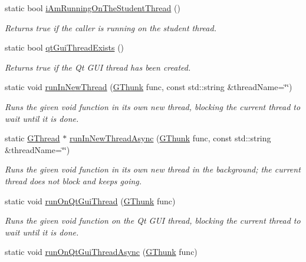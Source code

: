 \begin{DoxyCompactItemize}
static bool \mbox{\hyperlink{classsgl_1_1GThread_a3e60d512067e765b4e2d7c0c5bec39fa}{i\+Am\+Running\+On\+The\+Student\+Thread}} ()
\begin{DoxyCompactList}\small\item\em Returns true if the caller is running on the student thread. \end{DoxyCompactList}\item 
static bool \mbox{\hyperlink{classsgl_1_1GThread_afee663b5d7998135c2aab0585b2ad37f}{qt\+Gui\+Thread\+Exists}} ()
\begin{DoxyCompactList}\small\item\em Returns true if the Qt G\+UI thread has been created. \end{DoxyCompactList}\item 
static void \mbox{\hyperlink{classsgl_1_1GThread_ad70a32318f3f0a9cf25582379c6d7ffb}{run\+In\+New\+Thread}} (\mbox{\hyperlink{namespacesgl_aa508400d1219d217e0e9509ff59a58f4}{G\+Thunk}} func, const std\+::string \&thread\+Name=\char`\"{}\char`\"{})
\begin{DoxyCompactList}\small\item\em Runs the given void function in its own new thread, blocking the current thread to wait until it is done. \end{DoxyCompactList}\item 
static \mbox{\hyperlink{classsgl_1_1GThread}{G\+Thread}} $\ast$ \mbox{\hyperlink{classsgl_1_1GThread_aee1af0236d033fce36073899bb4368ed}{run\+In\+New\+Thread\+Async}} (\mbox{\hyperlink{namespacesgl_aa508400d1219d217e0e9509ff59a58f4}{G\+Thunk}} func, const std\+::string \&thread\+Name=\char`\"{}\char`\"{})
\begin{DoxyCompactList}\small\item\em Runs the given void function in its own new thread in the background; the current thread does not block and keeps going. \end{DoxyCompactList}\item 
static void \mbox{\hyperlink{classsgl_1_1GThread_a33da0c87717269710ac7a564a1ebbe64}{run\+On\+Qt\+Gui\+Thread}} (\mbox{\hyperlink{namespacesgl_aa508400d1219d217e0e9509ff59a58f4}{G\+Thunk}} func)
\begin{DoxyCompactList}\small\item\em Runs the given void function on the Qt G\+UI thread, blocking the current thread to wait until it is done. \end{DoxyCompactList}\item 
static void \mbox{\hyperlink{classsgl_1_1GThread_a4445680030c65d610b9e348d8d0cffc8}{run\+On\+Qt\+Gui\+Thread\+Async}} (\mbox{\hyperlink{namespacesgl_aa508400d1219d217e0e9509ff59a58f4}{G\+Thunk}} func)

\end{DoxyCompactItemize}
